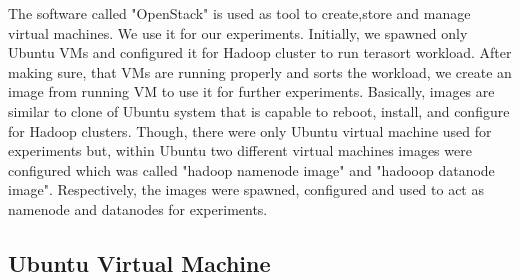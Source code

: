  
The software called "OpenStack" is used as tool to create,store and manage virtual machines. We use it for our experiments. Initially, we spawned only Ubuntu VMs and configured it for Hadoop cluster to run terasort workload. After making sure, that VMs are running properly and sorts the workload, we create an image from  running VM to use it for further experiments. Basically, images are similar to clone of Ubuntu system that is capable to reboot, install, and configure for Hadoop clusters. Though, there were only Ubuntu virtual machine used for experiments but, within Ubuntu two different virtual machines images were configured which was called "hadoop namenode image" and "hadooop datanode image". Respectively, the images were spawned, configured and used to act as namenode and datanodes for experiments.\\ 

\subsection{Ubuntu Virtual Machine}

